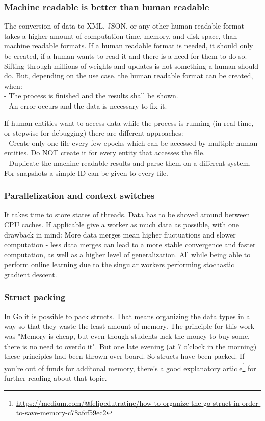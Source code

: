 \documentclass[11pt]{article}
\begin{document}
\subsubsection{Machine readable is better than human readable}
The conversion of data to XML, JSON, or any other human readable format takes a higher amount of computation time, memory, and disk space, than machine readable formats.
If a human readable format is needed, it should only be created, if a human wants to read it and there is a need for them to do so. Sifting through millions of weights and updates is not something a human should do. But, depending on the use case, the human readable format can be created, when:\\
- The process is finished and the results shall be shown.\\
- An error occurs and the data is necessary to fix it.

If human entities want to access data while the process is running (in real time, or stepwise for debugging) there are different approaches:\\
- Create only one file every few epochs which can be accessed by multiple human entities. Do NOT create it for every entity that accesses the file.\\
- Duplicate the machine readable results and parse them on a different system. For snapshots a simple ID can be given to every file.

\subsubsection{Parallelization and context switches}
It takes time to store states of threads. Data has to be shoved around between CPU caches. If applicable give a worker as much data as possible, with one drawback in mind: More data merges mean higher fluctuations and slower computation - less data merges can lead to a more stable convergence and faster computation\cite{DBLP:journals/corr/Ruder16}, as well as a higher level of generalization\cite{DBLP:journals/corr/IoffeS15}. All while being able to perform online learning due to the singular workers performing stochastic gradient descent.

\subsubsection{Struct packing}
In Go it is possible to pack structs. That means organizing the data types in a way so that they waste the least amount of memory. The principle for this work was "Memory is cheap, but even though students lack the money to buy some, there is no need to overdo it". But one late evening (at 7 o'clock in the morning) these principles had been thrown over board. So structs have been packed. If you're out of funds for additonal memory, there's a good explanatory article\footnote{\url{https://medium.com/@felipedutratine/how-to-organize-the-go-struct-in-order-to-save-memory-c78afcf59ec2}} for further reading about that topic.
\end{document}
